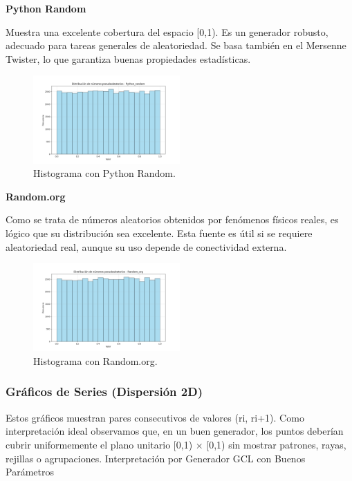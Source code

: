 \documentclass{article}
\begin{document}
\textbf{Python Random}

Muestra una excelente cobertura del espacio [0,1). Es un generador robusto, adecuado para tareas generales de aleatoriedad. Se basa también en el Mersenne Twister, lo que garantiza buenas propiedades estadísticas.

\begin{figure}[H]
\centering
\includegraphics[width=0.5\textwidth]{Imagenes/distribucion_Python_random.png}
\caption{Histograma con Python Random.}
\end{figure}

\newpage
\textbf{Random.org}

Como se trata de números aleatorios obtenidos por fenómenos físicos reales, es lógico que su distribución sea excelente. Esta fuente es útil si se requiere aleatoriedad real, aunque su uso depende de conectividad externa.

\begin{figure}[H]
\centering
\includegraphics[width=0.5\textwidth]{Imagenes/distribucion_Random_org.png}
\caption{Histograma con Random.org.}
\end{figure}

\subsubsection{Gráficos de Series (Dispersión 2D)}
Estos gráficos muestran pares consecutivos de valores (ri, ri+1).
Como interpretación ideal observamos que, en un buen generador, los puntos deberían cubrir uniformemente el plano unitario [0,1) × [0,1) sin mostrar patrones, rayas, rejillas o agrupaciones.
Interpretación por Generador
GCL con Buenos Parámetros
\end{document}
